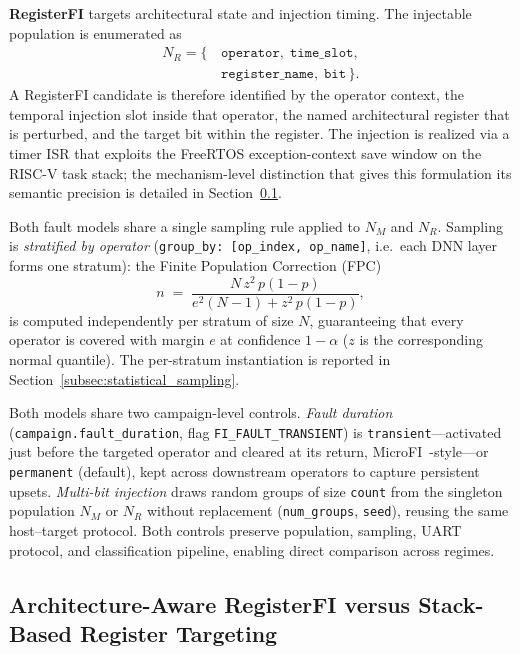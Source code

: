 \documentclass[conference]{IEEEtran}
\begin{document}
\textbf{RegisterFI} targets architectural state and injection timing. The injectable population is enumerated as
\begin{equation}
\begin{aligned}
N_R = \{\,& \texttt{operator},\; \texttt{time\_slot}, \\
          & \texttt{register\_name},\; \texttt{bit} \,\}.
\end{aligned}
\label{eq:registerfi_population}
\end{equation}
A RegisterFI candidate is therefore identified by the operator context, the temporal injection slot inside that operator, the named architectural register that is perturbed, and the target bit within the register. The injection is realized via a timer ISR that exploits the FreeRTOS exception-context save window on the RISC-V task stack; the mechanism-level distinction that gives this formulation its semantic precision is detailed in Section~\ref{subsec:registerfi_mechanism}.

Both fault models share a single sampling rule applied to $N_M$ and $N_R$. Sampling is \emph{stratified by operator} (\texttt{group\_by: [op\_index, op\_name]}, i.e.\ each DNN layer forms one stratum): the Finite Population Correction (FPC)~\cite{leveugle2009statistical}
\begin{equation}
n \;=\;
\frac{N\,z^{2}\,p(1-p)}
{e^{2}(N-1)+z^{2}\,p(1-p)},
\label{eq:finite_sample}
\end{equation}
is computed independently per stratum of size $N$, guaranteeing that every operator is covered with margin $e$ at confidence $1{-}\alpha$ ($z$ is the corresponding normal quantile). The per-stratum instantiation is reported in Section~\ref{subsec:statistical_sampling}.

Both models share two campaign-level controls. \emph{Fault duration} (\texttt{campaign.fault\_duration}, flag \texttt{FI\_FAULT\_TRANSIENT}) is \texttt{transient}---activated just before the targeted operator and cleared at its return, MicroFI~\cite{de2025MicroFI}-style---or \texttt{permanent} (default), kept across downstream operators to capture persistent upsets. \emph{Multi-bit injection} draws random groups of size \texttt{count} from the singleton population $N_M$ or $N_R$ without replacement (\texttt{num\_groups}, \texttt{seed}), reusing the same host--target protocol. Both controls preserve population, sampling, UART protocol, and classification pipeline, enabling direct comparison across regimes.


\subsection{Architecture-Aware RegisterFI versus Stack-Based Register Targeting}
\label{subsec:registerfi_mechanism}
\end{document}
